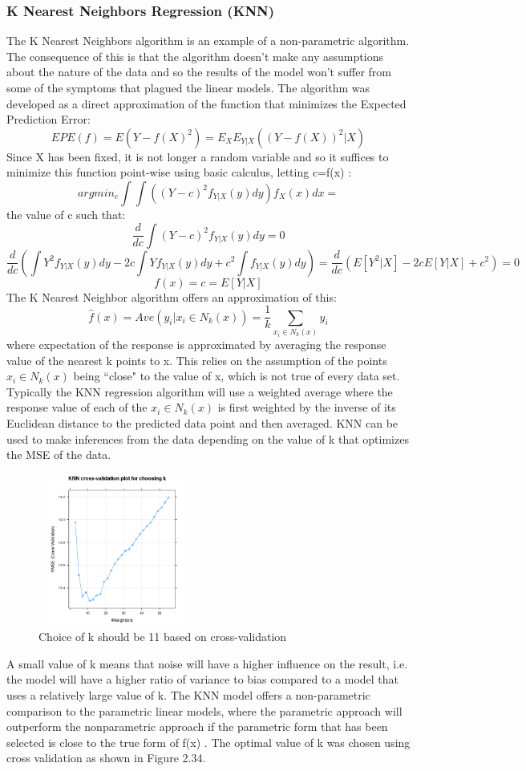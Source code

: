 \subsubsection{K Nearest Neighbors Regression (KNN)}
The K Nearest Neighbors algorithm is an example of a non-parametric algorithm. The consequence of this is that the algorithm doesn't make any assumptions about the nature of the data and so the results of the model won't suffer from some of the symptoms that plagued the linear models. The algorithm was developed as a direct approximation of the function that minimizes the Expected Prediction Error:
\[EPE(f)=E(Y-f(X)^2) = E_XE_{Y|X}((Y-f(X))^2|X)\]
Since X has been fixed, it is not longer a random variable and so it suffices to minimize this function point-wise using basic calculus, letting c=f(x) \cite{ESL}: 
\[argmin_c \int\int((Y-c)^2 f_{Y|X}(y)dy)f_X(x)dx=\] the value of c such that: \[\frac{d}{dc}\int (Y-c)^2f_{Y|X}(y)dy=0\]\[\frac{d}{dc}(
\int Y^2f_{Y|X}(y)dy -2c\int Yf_{Y|X}(y)dy+c^2\int f_{Y|X}(y)dy)=
\frac{d}{dc}(E[{Y^2}|X]-2cE[Y|X]+c^2)=0\]
\[f(x)=c=E[Y|X]\]
The K Nearest Neighbor algorithm offers an approximation of this: 
\[\hat{f}(x)=Ave(y_i|x_i \in N_k(x))=\frac{1}{k}\sum_{x_i\in N_k(x)}^{} y_i \]
where expectation of the response is approximated by averaging the response value of the nearest k points to x. This relies on the assumption of the points $x_i \in N_k(x)$ being ``close" to the value of x, which is not true of every data set. Typically the KNN regression algorithm will use a weighted average where the response value of each of the $x_i \in N_k(x)$ is first weighted by the inverse of its Euclidean distance to the predicted data point and then averaged. KNN can be used to make inferences from the data depending on the value of k that optimizes the MSE of the data.\hfill\break
\begin{figure}
	\vspace{-2.2em}
	\includegraphics[height=5cm,width=5.2cm]{Images/KNNCrossValidation.png}
	\caption{Choice of k should be 11 based on cross-validation}
\end{figure}
A small value of k means that noise will have a higher influence on the result, i.e. the model will have a higher ratio of variance to bias compared to a model that uses a relatively large value of k. The KNN model offers a non-parametric comparison to the parametric linear models, where the parametric approach will outperform the nonparametric approach if the parametric form that has been selected is close to the true form of f(x) \cite{ISLR}. The optimal value of k was chosen using cross validation as shown in Figure 2.34.
\hfill\break

